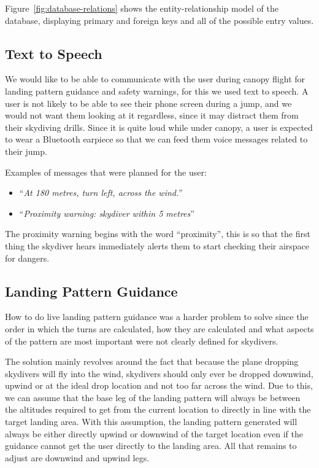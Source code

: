 Figure~\ref{fig:database-relations} shows the entity-relationship model of the database, displaying primary and foreign keys and all of the possible entry values.

\subsection{Text to Speech}
We would like to be able to communicate with the user during canopy flight for landing pattern guidance and safety warnings, for this we used text to speech. A user is not likely to be able to see their phone screen during a jump, and we would not want them looking at it regardless, since it may distract them from their skydiving drills. Since it is quite loud while under canopy, a user is expected to wear a Bluetooth earpiece so that we can feed them voice messages related to their jump.

Examples of messages that were planned for the user:
\begin{itemize}
  \item ``\textit{At 180 metres, turn left, across the wind.}''
  \item ``\textit{Proximity warning: skydiver within 5 metres}''
\end{itemize}

The proximity warning begins with the word ``proximity'', this is so that the first thing the skydiver hears immediately alerts them to start checking their airspace for dangers.

\subsection{Landing Pattern Guidance}\label{subsec:landing-guidance}
How to do live landing pattern guidance was a harder problem to solve since the order in which the turns are calculated, how they are calculated and what aspects of the pattern are most important were not clearly defined for skydivers.

The solution mainly revolves around the fact that because the plane dropping skydivers will fly into the wind, skydivers should only ever be dropped downwind, upwind or at the ideal drop location and not too far across the wind. Due to this, we can assume that the base leg of the landing pattern will always be between the altitudes required to get from the current location to directly in line with the target landing area. With this assumption, the landing pattern generated will always be either directly upwind or downwind of the target location even if the guidance cannot get the user directly to the landing area. All that remains to adjust are downwind and upwind legs.

